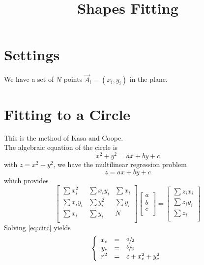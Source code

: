\documentclass[aps]{revtex4}
\begin{document}
\title{Shapes Fitting}

\section{Settings}

We have a set of $N$ points $\vec{A}_i = (x_i,y_i)$ in the plane.

\section{Fitting to a Circle}
This is the method of Kasa and Coope.\\
The algebraic equation of the circle is
\begin{equation}
	x^2+y^2 = ax+by+c
\end{equation}
with $z = x^2+y^2$, we have the multilinear regression problem
\begin{equation}
	z = ax+by+c
\end{equation}
which provides
\begin{equation}
	\label{eq:circ}
	\begin{bmatrix}
	\sum x_i^2 & \sum x_iy_i & \sum x_i\\
	\sum x_iy_i & \sum y_i^2 & \sum y_i\\
	\sum x_i    & \sum y_i & N \\
	\end{bmatrix}
	\begin{bmatrix}
	a\\
	b\\
	c\\
	\end{bmatrix}
	=
	\begin{bmatrix}
	\sum z_i x_i\\
	\sum z_i y_i\\
	\sum z_i\\
	\end{bmatrix}
\end{equation}
Solving \eqref{eq:circ} yields
\begin{equation}
	\left\lbrace
	\begin{array}{rcl}
	x_c & = & \sfrac{a}{2}\\
	y_c & = & \sfrac{b}{2}\\
	r^2 & = & {c}+x_c^2+y_c^2\\
	\end{array}
	\right.
\end{equation}
\end{document}
